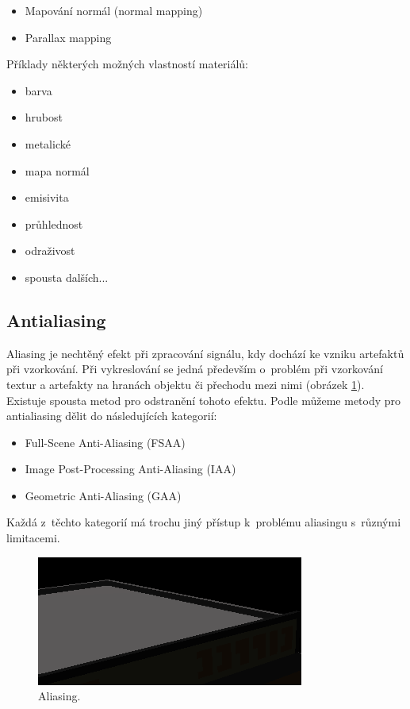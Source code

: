 \begin{itemize}
	\item Mapování normál (normal mapping)
	\item Parallax mapping
\end{itemize}

Příklady některých možných vlastností materiálů:

\begin{itemize}
	\item barva
	\item hrubost
	\item metalické
	\item mapa normál
	\item emisivita
	\item průhlednost
	\item odraživost
	\item spousta dalších...
\end{itemize}


\subsection{Antialiasing}
Aliasing je nechtěný efekt při zpracování signálu, kdy dochází ke vzniku artefaktů při vzorkování. Při vykreslování se jedná především o~problém při vzorkování textur a artefakty na hranách objektu či přechodu mezi nimi (obrázek \ref{fig:aliasing}). Existuje spousta metod pro odstranění tohoto efektu. Podle \cite{aa_survey} můžeme metody pro antialiasing dělit do následujících kategorií:

\begin{itemize}
	\item Full-Scene Anti-Aliasing (FSAA)
	\item Image Post-Processing Anti-Aliasing (IAA)
	\item Geometric Anti-Aliasing (GAA)
\end{itemize}

Každá z~těchto kategorií má trochu jiný přístup k~problému aliasingu s~různými limitacemi.

\begin{figure}[H]
	\centering
	\includegraphics[scale=2]{obrazky-figures/aliasing.png}
	\caption{Aliasing. }
	\label{fig:aliasing}
\end{figure}

